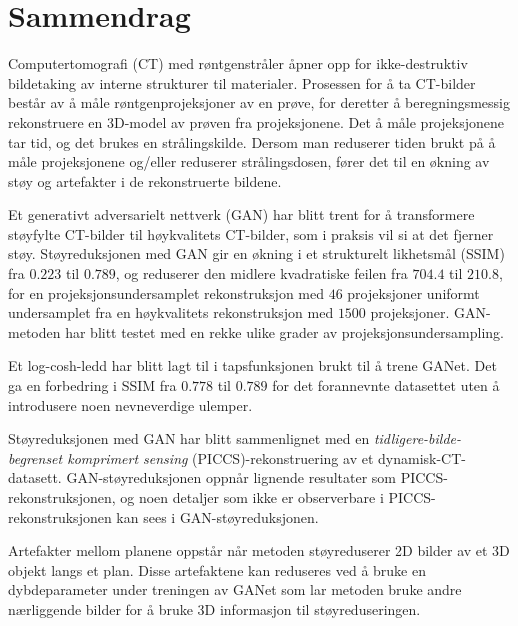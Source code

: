 \chapter*{Sammendrag}
Computertomografi (CT) med røntgenstråler åpner opp for ikke-destruktiv bildetaking av interne strukturer til materialer. Prosessen for å ta CT-bilder består av å måle røntgenprojeksjoner av en prøve, for deretter å beregningsmessig rekonstruere en 3D-model av prøven fra projeksjonene. Det å måle projeksjonene tar tid, og det brukes en strålingskilde. Dersom man reduserer tiden brukt på å måle projeksjonene og/eller reduserer strålingsdosen, fører det til en økning av støy og artefakter i de rekonstruerte bildene.

Et generativt adversarielt nettverk (GAN) har blitt trent for å transformere støyfylte CT-bilder til høykvalitets CT-bilder, som i praksis vil si at det fjerner støy. Støyreduksjonen med GAN gir en økning i et strukturelt likhetsmål (SSIM) fra $0.223$ til $0.789$, og reduserer den midlere kvadratiske feilen fra $704.4$ til $210.8$, for en projeksjonsundersamplet rekonstruksjon med $46$ projeksjoner uniformt undersamplet fra en høykvalitets rekonstruksjon med $1500$ projeksjoner. GAN-metoden har blitt testet med en rekke ulike grader av projeksjonsundersampling. 

Et log-cosh-ledd har blitt lagt til i tapsfunksjonen brukt til å trene GANet. Det ga en forbedring i SSIM fra $0.778$ til $0.789$ for det forannevnte datasettet uten å introdusere noen nevneverdige ulemper. 

Støyreduksjonen med GAN har blitt sammenlignet med en \textit{tidligere-bilde-begrenset komprimert sensing} (PICCS)-rekonstruering av et dynamisk-CT-datasett. GAN-støyreduksjonen oppnår lignende resultater som PICCS-rekonstruksjonen, og noen detaljer som ikke er observerbare i PICCS-rekonstruksjonen kan sees i GAN-støyreduksjonen. 

Artefakter mellom planene oppstår når metoden støyreduserer 2D bilder av et 3D objekt langs et plan. Disse artefaktene kan reduseres ved å bruke en dybdeparameter under treningen av GANet som lar metoden bruke andre nærliggende bilder for å bruke 3D informasjon til støyreduseringen. 